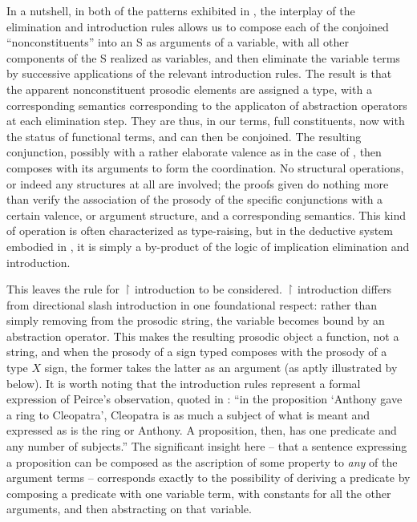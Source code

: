 \documentclass[output=paper,colorlinks,citecolor=brown]{langscibook}
\begin{document}
In a nutshell, in both of the patterns exhibited in , the
interplay of the elimination and introduction rules allows us to
compose each of the conjoined ``nonconstituents'' into an S as arguments
of a variable, with all other components of the S realized as
variables, and then eliminate the variable terms by successive
applications of the relevant introduction rules. The result is that
the apparent nonconstituent prosodic elements are assigned a type,
with a corresponding semantics corresponding to the applicaton of
abstraction operators at each elimination step. They are thus, in our
terms, full constituents, now with the status of functional terms, and
can then be conjoined. The resulting conjunction, possibly with a
rather elaborate valence as in the case of , then composes with
its arguments to form the coordination. No structural operations, or
indeed any structures at all are involved; the proofs given do
nothing more than verify the association of the prosody of the
specific conjunctions with a certain valence, or argument structure,
and a corresponding semantics. This kind of operation is often
characterized as type-raising, but in the deductive system embodied in
, it is simply a by-product of the logic of implication
elimination and introduction.

This leaves the rule for \ensuremath{\vs} introduction to be considered. \ensuremath{\vs}
introduction differs from directional slash introduction in one
foundational respect: rather than simply removing \pt{ \ensuremath{\greekp} } from the
prosodic string, the variable becomes bound by an abstraction
operator. This makes the resulting prosodic object a function, not a
string, and when the prosody of a sign typed  composes with
the prosody of a type $X$ sign, the former takes the latter as an
argument (as aptly illustrated by  below).  It is worth
noting that the introduction rules represent a formal expression of
Peirce's observation, quoted in \citet[8]{nothPeirce}: ``in the proposition
{`}Anthony gave a ring to Cleopatra', Cleopatra is as much a subject of what is
meant and expressed as is the ring or Anthony. A proposition, then,
has one predicate and any number of subjects.'' The significant insight
here -- that a sentence expressing a proposition can be composed as the
ascription of some property to \textsl{any} of the argument
terms -- corresponds exactly to the possibility of deriving a predicate
by composing a predicate with one variable term, with constants for
all the other arguments, and then abstracting on that
variable.
\end{document}
